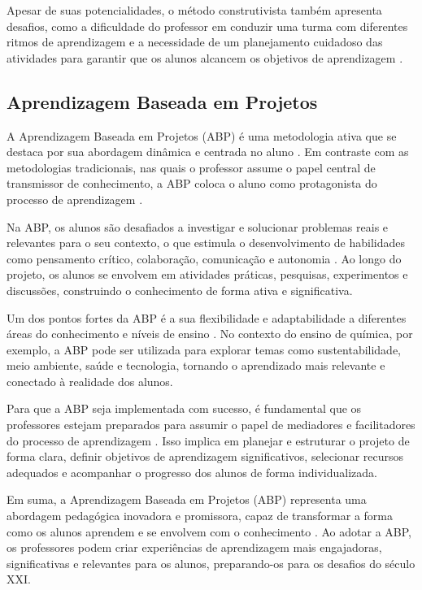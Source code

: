 Apesar de suas potencialidades, o método construtivista também apresenta desafios, como a dificuldade do professor em conduzir uma turma com diferentes ritmos de aprendizagem e a necessidade de um planejamento cuidadoso das atividades para garantir que os alunos alcancem os objetivos de aprendizagem \cite{haddadetal1993,pinho2010}.

\subsection{Aprendizagem Baseada em Projetos}

A Aprendizagem Baseada em Projetos (ABP) é uma metodologia ativa que se destaca por sua abordagem dinâmica e centrada no aluno \cite{alecia2022}. Em contraste com as metodologias tradicionais, nas quais o professor assume o papel central de transmissor de conhecimento, a ABP coloca o aluno como protagonista do processo de aprendizagem \cite{fartura2007}.

Na ABP, os alunos são desafiados a investigar e solucionar problemas reais e relevantes para o seu contexto, o que estimula o desenvolvimento de habilidades como pensamento crítico, colaboração, comunicação e autonomia \cite{moran2014}. Ao longo do projeto, os alunos se envolvem em atividades práticas, pesquisas, experimentos e discussões, construindo o conhecimento de forma ativa e significativa.

Um dos pontos fortes da ABP é a sua flexibilidade e adaptabilidade a diferentes áreas do conhecimento e níveis de ensino \cite{bacich2018}. No contexto do ensino de química, por exemplo, a ABP pode ser utilizada para explorar temas como sustentabilidade, meio ambiente, saúde e tecnologia, tornando o aprendizado mais relevante e conectado à realidade dos alunos.

Para que a ABP seja implementada com sucesso, é fundamental que os professores estejam preparados para assumir o papel de mediadores e facilitadores do processo de aprendizagem \cite{diesel2017}. Isso implica em planejar e estruturar o projeto de forma clara, definir objetivos de aprendizagem significativos, selecionar recursos adequados e acompanhar o progresso dos alunos de forma individualizada.

Em suma, a Aprendizagem Baseada em Projetos (ABP) representa uma abordagem pedagógica inovadora e promissora, capaz de transformar a forma como os alunos aprendem e se envolvem com o conhecimento \cite{arthur2020}. Ao adotar a ABP, os professores podem criar experiências de aprendizagem mais engajadoras, significativas e relevantes para os alunos, preparando-os para os desafios do século XXI.


